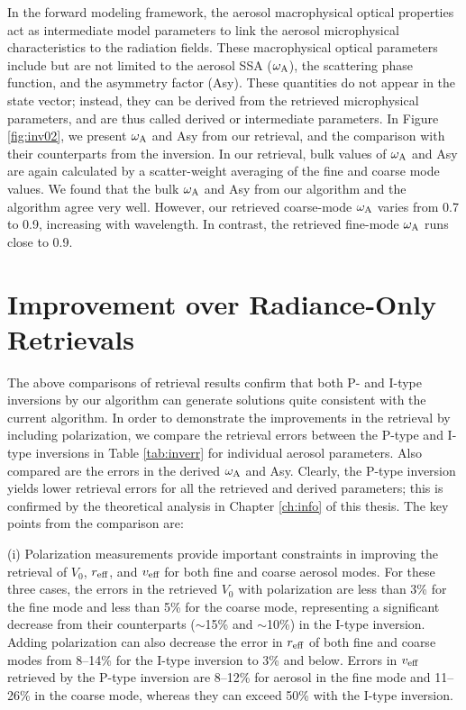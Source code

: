 In the forward modeling framework, the aerosol macrophysical optical properties
act as intermediate model parameters to link the aerosol microphysical
characteristics to the radiation fields. These macrophysical optical parameters
include but are not limited to the aerosol SSA ($\omega_\text{A}$), the scattering phase
function, and the asymmetry factor (Asy). These quantities do not appear in the
state vector; instead, they can be derived from the retrieved microphysical
parameters, and are thus called derived or intermediate parameters. In Figure
\ref{fig:inv02}, we present $\omega_\text{A}$ and Asy from our retrieval, and the 
comparison with their counterparts from the \Dub inversion. In our retrieval,
bulk values of $\omega_\text{A}$ and Asy are again calculated by a scatter-weight 
averaging of the fine and coarse mode values. We found that the bulk $\omega_\text{A}$ 
and Asy from our algorithm and the \Dub algorithm agree very well. 
However, our retrieved coarse-mode $\omega_\text{A}$ varies from 0.7 to 0.9, increasing
with wavelength. In contrast, the retrieved fine-mode $\omega_\text{A}$ runs close to 0.9. 

\section{Improvement over Radiance-Only Retrievals} \label{sec:inv1}

The above comparisons of retrieval results confirm that both P- and I-type
inversions by our algorithm can generate solutions quite consistent with the
current \Dub algorithm. In order to demonstrate the improvements in the
retrieval by including polarization, we compare the retrieval errors between
the P-type and I-type inversions in Table \ref{tab:inverr} for individual aerosol parameters.
Also compared are the errors in the derived $\omega_\text{A}$ and Asy. Clearly, the P-type
inversion yields lower retrieval errors for all the retrieved and derived
parameters; this is confirmed by the theoretical analysis in Chapter
\ref{ch:info} of this thesis. The key points from the comparison are:

(i) Polarization measurements provide important constraints in improving the
retrieval of $V_0$, $r_\text{eff}$, and $v_\text{eff}$ for both fine and coarse aerosol modes. For
these three cases, the errors in the retrieved $V_0$ with polarization are less
than 3\% for the fine mode and less than 5\% for the coarse mode, representing a
significant decrease from their counterparts ($\sim$15\% and $\sim$10\%) in the I-type
inversion. Adding polarization can also decrease the error in $r_\text{eff}$ of both
fine and coarse modes from 8--14\% for the I-type inversion to 3\% and below.
Errors in $v_\text{eff}$ retrieved by the P-type inversion are 8--12\% for aerosol in the
fine mode and 11--26\% in the coarse mode, whereas they can exceed 50\% with the
I-type inversion.

